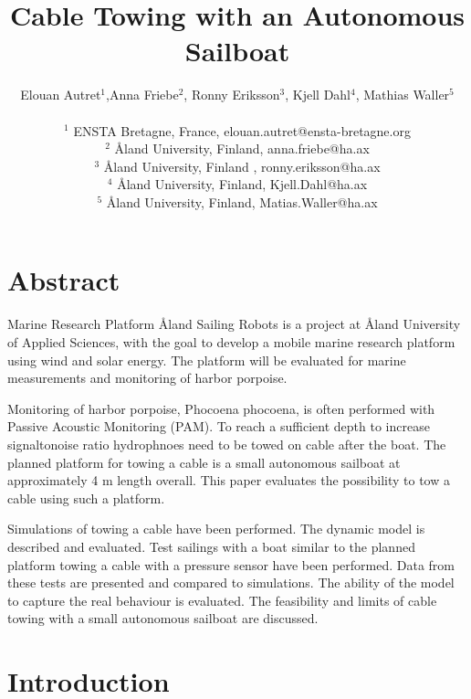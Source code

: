 \documentclass[11pt]{article} %
\title{ Cable Towing with an Autonomous Sailboat }
\author{Elouan Autret$^{1}$,Anna Friebe$^{2}$, Ronny Eriksson$^{3}$, Kjell Dahl$^{4}$, Mathias Waller$^{5}$\\
\\
\normalsize{$^{1}$ ENSTA Bretagne, France, elouan.autret@ensta-bretagne.org}\\
\normalsize{$^{2}$ \r{A}land University, Finland, anna.friebe@ha.ax}\\
\normalsize{$^{3}$ \r{A}land University, Finland , ronny.eriksson@ha.ax}\\
\normalsize{$^{4}$ \r{A}land University, Finland, Kjell.Dahl@ha.ax}\\
\normalsize{$^{5}$ \r{A}land University, Finland, Matias.Waller@ha.ax}\\
}
\date{}
\begin{document}
\maketitle

\renewcommand{\contentsname}{Contents}	%
\renewcommand{\bibname}{Bibliography}	%


\section*{Abstract}
Marine Research Platform \r{A}land Sailing Robots is a project at \r{A}land University of Applied  Sciences, with the goal to develop a mobile marine research platform using wind and solar energy. The platform will be evaluated for marine measurements and monitoring of harbor porpoise.

Monitoring of harbor porpoise, Phocoena phocoena, is often performed with Passive Acoustic Monitoring (PAM). To reach a sufficient depth to increase signaltonoise ratio hydrophnoes need to be towed on cable after the boat. The planned platform for towing a cable is a small autonomous sailboat at approximately 4 m length overall. This paper evaluates the possibility to tow a cable using such a platform.
   
Simulations of towing a cable have been performed. The dynamic model is described and evaluated. Test sailings with a boat similar to the planned platform towing a cable with a pressure sensor have been performed. Data from these tests are presented and compared to simulations. The ability of the model to capture the real behaviour is evaluated. The feasibility and limits of cable towing with a small autonomous sailboat are discussed.
   



\section{Introduction}

\end{document}
